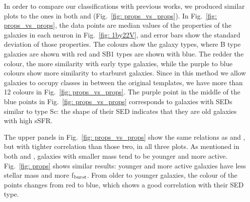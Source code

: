         In order to compare our classifications with previous works, we produced similar plots to the ones in both  and  (Fig.~\ref{fig: props_vs_props}).
        In Fig.~\ref{fig: props_vs_props}, the data points are median values of the properties of the galaxies in each neuron in Fig.~\ref{fig: 1by22V}, and error bars show the standard deviation of those properties.
        The colours show the galaxy types, where B type galaxies are shown with red and SB1 types are shown with blue.
        The redder the colour, the more similarity with early type galaxies, while the purple to blue colours show more similarity to starburst galaxies.
        Since in this method we allow galaxies to occupy classes in between the original  templates, we have more than 12 colours in Fig.~\ref{fig: props_vs_props}.
        The purple point in the middle of the blue points in  Fig.~\ref{fig: props_vs_props} corresponds to galaxies with SEDs similar to type Sc: the shape of their SED indicates that they are old galaxies with high sSFR.
        
        The upper panels in Fig.~\ref{fig: props_vs_props} show the same relations as  and , but with tighter correlation than those two, in all three plots.
        As mentioned in both  and , galaxies with smaller mass tend to be younger and more active.
        Fig.~\ref{fig: props} shows similar results: younger and more active galaxies have less stellar mass and more f$_{\rm {burst}}$.
        From older to younger galaxies, the colour of the points changes from red to blue, which shows a good correlation with their SED type.
        
